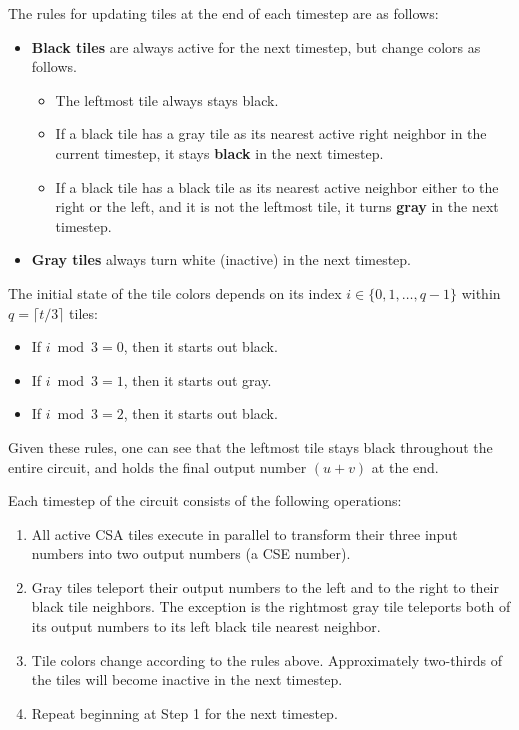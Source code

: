 \documentclass[twoside]{article}
\begin{document}
The rules for
updating tiles at the end of each timestep are as follows:
\begin{itemize}
\item \textbf{Black tiles} are always active for the next timestep, but
change colors as follows.
\begin{itemize}
\item The leftmost tile always stays black.
\item If a black tile has a gray tile as its nearest active right neighbor in
the current timestep,
it stays \textbf{black} in the next timestep.
\item If a black tile has a black tile as its nearest active neighbor either
to the right or the left, and it is not the leftmost tile,
it turns \textbf{gray} in the next timestep.
\end{itemize}
\item \textbf{Gray tiles} always turn white (inactive) in the next timestep.
\end{itemize}

The initial state of the tile colors depends on its index
$i \in \{0, 1, \ldots, q-1\}$ within $q = \lceil t/3 \rceil$ tiles:
\begin{itemize}
\item If $i \bmod 3 = 0$, then it starts out black.
\item If $i \bmod 3 = 1$, then it starts out gray.
\item If $i \bmod 3 = 2$, then it starts out black.
\end{itemize}

Given these rules, one can see that the leftmost tile stays black
throughout the entire circuit, and holds the final output number $(u+v)$ at
the end.

Each timestep of the circuit consists of the following operations:

\begin{enumerate}
\item
All active CSA tiles execute in
parallel to transform their three input numbers into two output numbers
(a CSE number).
\item
Gray tiles teleport their output numbers to the left and to the right to
their black tile neighbors. The exception is the rightmost gray tile
teleports both of its output numbers to its left black tile nearest neighbor.
\item
Tile colors change according to the rules above. Approximately
two-thirds of the tiles will
become inactive in the next timestep.
\item
Repeat beginning at Step 1 for the next timestep.
\end{enumerate}
\end{document}
